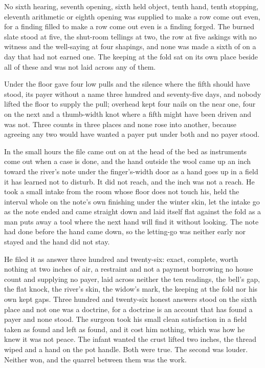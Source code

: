 No sixth hearing, seventh opening, sixth held object, tenth hand, tenth stopping, eleventh arithmetic or eighth opening was supplied to make a row come out even, for a finding filled to make a row come out even is a finding forged. The burned slate stood at five, the shut-room tellings at two, the row at five askings with no witness and the well-saying at four shapings, and none was made a sixth of on a day that had not earned one. The keeping at the fold sat on its own place beside all of these and was not laid across any of them.

Under the floor  gave four low pulls and the silence where the fifth should have stood, its payer without a name three hundred and seventy-five days, and nobody lifted the floor to supply the pull; overhead  kept four nails on the near one, four on the next and a thumb-width knot where a fifth might have been driven and was not. Three counts in three places and none rose into another, because agreeing any two would have wanted a payer put under both and no payer stood.

In the small hours the file came out on  at the head of the bed as instruments come out when a case is done, and the hand outside the wool came up an inch toward the river's note under the finger's-width door as a hand goes up in a field it has learned not to disturb. It did not reach, and the inch was not a reach. He took a small intake from the room whose floor does not touch his, held the interval whole on the note's own finishing under the winter skin, let the intake go as the note ended and came straight down and laid itself flat against the fold as a man puts away a tool where the next hand will find it without looking. The note had done before the hand came down, so the letting-go was neither early nor stayed and the hand did not stay.

He filed it as answer three hundred and twenty-six: exact, complete, worth nothing at two inches of air, a restraint and not a payment borrowing no house count and supplying no payer, laid across neither the ten readings, the bell's gap, the flat knock, the river's skin, the widow's mark, the keeping at the fold nor his own kept gaps. Three hundred and twenty-six honest answers stood on the sixth place and not one was a doctrine, for a doctrine is an account that has found a payer and none stood. The surgeon took his small clean satisfaction in a field taken as found and left as found, and it cost him nothing, which was how he knew it was not peace. The infant wanted the crust lifted two inches, the thread wiped and a hand on the pot handle. Both were true. The second was louder. Neither won, and the quarrel between them was the work.

